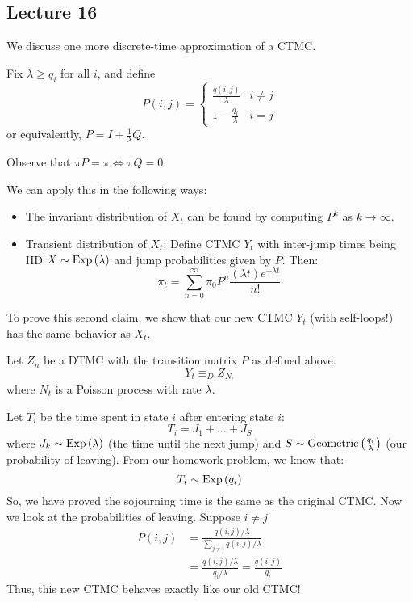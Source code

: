 \subsection{Lecture 16}

We discuss one more discrete-time approximation of a CTMC.
\begin{definition}
    Fix $\lambda \geq q_i$ for all $i$, and define 
    \[ P(i, j) = \begin{cases}
        \frac{q(i, j)}{\lambda} & i \neq j \\
        1 - \frac{q_i}{\lambda} & i = j
    \end{cases} \]
    or equivalently, $P = I + \frac{1}{\lambda} Q$.
    
    Observe that $\pi P = \pi \iff \pi Q = 0$.
\end{definition}

We can apply this in the following ways:
\begin{itemize}
    \item The invariant distribution of $X_t$ can be found by computing $P^k$ as $k \to \infty$.
    \item Transient distribution of $X_t$: Define CTMC $Y_t$ with inter-jump times being IID $X \sim \text{Exp}\left( \lambda \right)$ and jump probabilities given by $P$. Then:
    \[ \pi_t = \sum_{n = 0}^{\infty} \pi_0 P^n \frac{(\lambda t) e^{-\lambda t}}{n!} \]
\end{itemize}

To prove this second claim, we show that our new CTMC $Y_t$ (with self-loops!) has the same behavior as $X_t$.
\begin{proof*}
    Let $Z_n$ be a DTMC with the transition matrix $P$ as defined above.
    \[ Y_t \equiv_D Z_{N_t} \]
    where $N_t$ is a Poisson process with rate $\lambda$.

    Let $T_i$ be the time spent in state $i$ after entering state $i$:
    \[ T_i = J_1 + \dots + J_S \]
    where $J_k \sim \text{Exp}\left( \lambda \right)$ (the time until the next jump) and $S \sim \text{Geometric}\left( \frac{q_i}{\lambda} \right)$ (our probability of leaving).
    From our homework problem, we know that:
    \[ T_i \sim \text{Exp}\left( q_i \right) \]
    So, we have proved the sojourning time is the same as the original CTMC. Now we look at the probabilities of leaving. Suppose $i \neq j$
    \begin{align*}
        P(i, j) &= \frac{q(i,j) / \lambda}{\sum_{j \neq i} q(i, j) / \lambda} \\
        &= \frac{q(i, j) / \lambda}{q_i/\lambda} = \frac{q(i,j)}{q_i}
    \end{align*}
    Thus, this new CTMC behaves exactly like our old CTMC!
\end{proof*}


